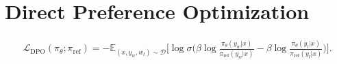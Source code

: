 \section{Direct Preference Optimization}
\label{sec:nlp_dpo}

\begin{align}
	\mathcal{L}_{\text{DPO}}(\pi_\theta; \pi_{\text{ref}}) = -\mathbb{E}_{(x, y_w, w_l)\sim \mathcal{D}}\bigg[\log \sigma \bigg(\beta \log \frac{\pi_\theta(y_w|x)}{\pi_{\text{ref}}(y_w|x)}-\beta \log \frac{\pi_\theta(y_l|x)}{\pi_{\text{ref}}(y_l|x)}\bigg)\bigg].
	\label{eq:dpo_loss}
\end{align}
